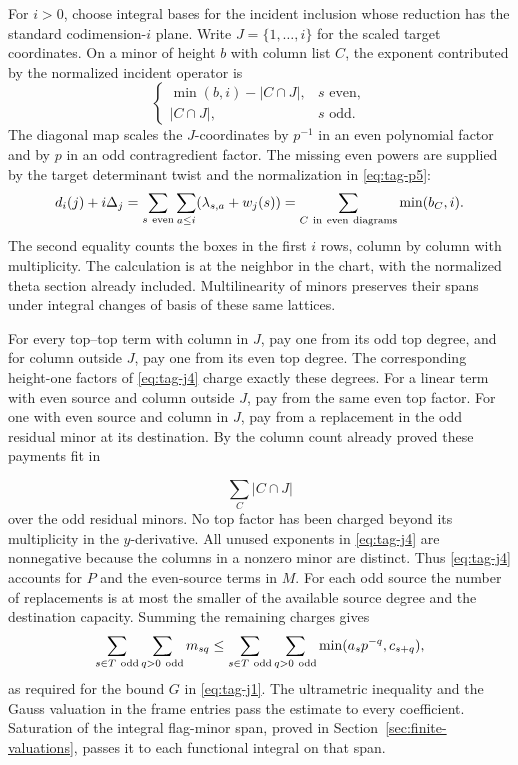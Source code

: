 For \(i>0\), choose integral bases for the incident inclusion
whose reduction has the standard codimension-\(i\) plane.
Write \(J=\{1,\ldots,i\}\) for the scaled target coordinates.
On a minor of height \(b\) with column list \(C\), the exponent
contributed by the normalized incident operator is
\[
 \begin{cases}
    \min(b,i)-|C\cap J|,&s\text{ even},\\
    |C\cap J|,&s\text{ odd}.
 \end{cases}                                                       \tag{J4}\label{eq:tag-j4}
\]
The diagonal map scales the \(J\)-coordinates by \(p^{-1}\)
in an even polynomial factor and by \(p\) in an odd
contragredient factor. The missing even powers are supplied by
the target determinant twist and the normalization in \eqref{eq:tag-p5}:
\[
 d_i(j)+i\Delta_j
   =\sum_{s\ {\rm even}}\sum_{a\le i}(\lambda_{s,a}+w_j(s))
   =\sum_{C\ {\rm in\ even\ diagrams}}\min(b_C,i).
\]
The second equality counts the boxes in the first \(i\) rows,
column by column with multiplicity. The calculation is at the
neighbor in the chart, with the normalized theta section already
included. Multilinearity of minors preserves their spans under
integral changes of basis of these same lattices.

For every top--top term with column in \(J\), pay one from its
odd top degree, and for column outside \(J\), pay one from its
even top degree. The corresponding height-one factors of \eqref{eq:tag-j4}
charge exactly these degrees. For a linear term with even source
and column outside \(J\), pay from the same even top factor.
For one with even source and column in \(J\), pay from a
replacement in the odd residual minor at its destination. By
the column count already proved these payments fit in

\[
  \sum_C |C\cap J|
\]
 over the odd residual minors. No top
factor has been charged beyond its multiplicity in the
\(y\)-derivative. All unused exponents in \eqref{eq:tag-j4} are nonnegative
because the columns in a nonzero minor are distinct.
Thus \eqref{eq:tag-j4} accounts for \(P\) and the even-source terms in
\(M\). For each odd source the number of replacements is at most
the smaller of the available source degree and the destination
capacity. Summing the remaining charges gives
\[
 \sum_{s\in T\ {\rm odd}}\sum_{q>0\ {\rm odd}}m_{sq}
 \le \sum_{s\in T\ {\rm odd}}\sum_{q>0\ {\rm odd}}
                    \min(a_sp^{-q},c_{s+q}),
\]
as required for the bound \(G\) in \eqref{eq:tag-j1}.
The ultrametric inequality and the Gauss valuation in the frame
entries pass the estimate to every coefficient. Saturation of the
integral flag-minor span, proved in Section~\ref{sec:finite-valuations},
passes it to each functional integral on that span.

